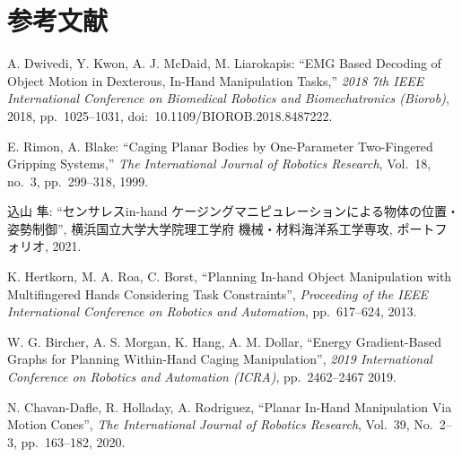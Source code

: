 \documentclass[a4paper,twoside,12pt,papersize, dvipdfmx]{iirthesis}
\begin{document}
    \newcommand{\figref}[1]{\figurename\ref{#1}}
    \newcommand{\tabref}[1]{\tablename\ref{#1}}
    \renewcommand{\eqref}[1]{式~(\ref{#1})}
    \newcommand{\chapref}[1]{\ref{#1}章}
    \newcommand{\secref}[1]{\ref{#1}節}
    \newcommand{\ssecref}[1]{\ref{#1}項}
    \newcommand{\appref}[1]{付録\ref{#1}}
\fi

\chapter{参考文献}\label{chap:bibliography}

\begin{thebibliography}{}
A. Dwivedi, Y. Kwon, A. J. McDaid, M. Liarokapis:
``EMG Based Decoding of Object Motion in Dexterous, In-Hand Manipulation Tasks,''
{\it 2018 7th IEEE International Conference on Biomedical Robotics and Biomechatronics (Biorob)},
2018, pp.~1025--1031, doi:~10.1109/BIOROB.2018.8487222.

E. Rimon, A. Blake:
``Caging Planar Bodies by One-Parameter Two-Fingered Gripping Systems,''
{\it The International Journal of Robotics Research}, Vol.~18, no.~3, pp.~299--318, 1999.

込山 隼:
``センサレスin-hand ケージングマニピュレーションによる物体の位置・姿勢制御'',
横浜国立大学大学院理工学府 機械・材料海洋系工学専攻, ポートフォリオ, 2021.
  
K. Hertkorn, M. A. Roa, C. Borst,
``Planning In-hand Object Manipulation with Multifingered Hands Considering Task Constraints'',
{\it Proceeding of the IEEE International Conference on Robotics and Automation}, 
pp.~617--624, 2013.

	W. G. Bircher, A. S. Morgan, K. Hang, A. M. Dollar,
  	``Energy Gradient-Based Graphs for Planning Within-Hand Caging Manipulation'',
  	{\it 2019 International Conference on Robotics and Automation (ICRA)},
  	pp.~2462--2467
  	2019.
    
 	N. Chavan-Dafle, R. Holladay, A. Rodriguez,
  	``Planar In-Hand Manipulation Via Motion Cones'',
  	 {\it The International Journal of Robotics Research},
  	 Vol.~39, No.~2--3, pp.~163--182,
  	2020.
  	

\end{thebibliography}
\end{document}
